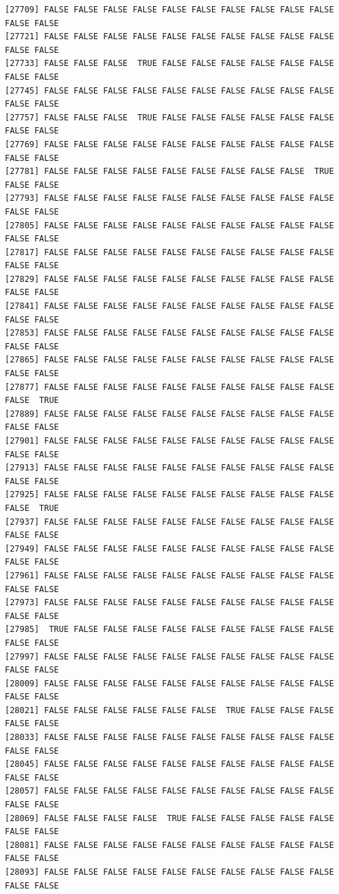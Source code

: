 \documentclass[
  a4paper,
  DIV=11,
  numbers=noendperiod]{scrartcl}
\begin{document}
\begin{verbatim}
[27709] FALSE FALSE FALSE FALSE FALSE FALSE FALSE FALSE FALSE FALSE FALSE FALSE
[27721] FALSE FALSE FALSE FALSE FALSE FALSE FALSE FALSE FALSE FALSE FALSE FALSE
[27733] FALSE FALSE FALSE  TRUE FALSE FALSE FALSE FALSE FALSE FALSE FALSE FALSE
[27745] FALSE FALSE FALSE FALSE FALSE FALSE FALSE FALSE FALSE FALSE FALSE FALSE
[27757] FALSE FALSE FALSE  TRUE FALSE FALSE FALSE FALSE FALSE FALSE FALSE FALSE
[27769] FALSE FALSE FALSE FALSE FALSE FALSE FALSE FALSE FALSE FALSE FALSE FALSE
[27781] FALSE FALSE FALSE FALSE FALSE FALSE FALSE FALSE FALSE  TRUE FALSE FALSE
[27793] FALSE FALSE FALSE FALSE FALSE FALSE FALSE FALSE FALSE FALSE FALSE FALSE
[27805] FALSE FALSE FALSE FALSE FALSE FALSE FALSE FALSE FALSE FALSE FALSE FALSE
[27817] FALSE FALSE FALSE FALSE FALSE FALSE FALSE FALSE FALSE FALSE FALSE FALSE
[27829] FALSE FALSE FALSE FALSE FALSE FALSE FALSE FALSE FALSE FALSE FALSE FALSE
[27841] FALSE FALSE FALSE FALSE FALSE FALSE FALSE FALSE FALSE FALSE FALSE FALSE
[27853] FALSE FALSE FALSE FALSE FALSE FALSE FALSE FALSE FALSE FALSE FALSE FALSE
[27865] FALSE FALSE FALSE FALSE FALSE FALSE FALSE FALSE FALSE FALSE FALSE FALSE
[27877] FALSE FALSE FALSE FALSE FALSE FALSE FALSE FALSE FALSE FALSE FALSE  TRUE
[27889] FALSE FALSE FALSE FALSE FALSE FALSE FALSE FALSE FALSE FALSE FALSE FALSE
[27901] FALSE FALSE FALSE FALSE FALSE FALSE FALSE FALSE FALSE FALSE FALSE FALSE
[27913] FALSE FALSE FALSE FALSE FALSE FALSE FALSE FALSE FALSE FALSE FALSE FALSE
[27925] FALSE FALSE FALSE FALSE FALSE FALSE FALSE FALSE FALSE FALSE FALSE  TRUE
[27937] FALSE FALSE FALSE FALSE FALSE FALSE FALSE FALSE FALSE FALSE FALSE FALSE
[27949] FALSE FALSE FALSE FALSE FALSE FALSE FALSE FALSE FALSE FALSE FALSE FALSE
[27961] FALSE FALSE FALSE FALSE FALSE FALSE FALSE FALSE FALSE FALSE FALSE FALSE
[27973] FALSE FALSE FALSE FALSE FALSE FALSE FALSE FALSE FALSE FALSE FALSE FALSE
[27985]  TRUE FALSE FALSE FALSE FALSE FALSE FALSE FALSE FALSE FALSE FALSE FALSE
[27997] FALSE FALSE FALSE FALSE FALSE FALSE FALSE FALSE FALSE FALSE FALSE FALSE
[28009] FALSE FALSE FALSE FALSE FALSE FALSE FALSE FALSE FALSE FALSE FALSE FALSE
[28021] FALSE FALSE FALSE FALSE FALSE FALSE  TRUE FALSE FALSE FALSE FALSE FALSE
[28033] FALSE FALSE FALSE FALSE FALSE FALSE FALSE FALSE FALSE FALSE FALSE FALSE
[28045] FALSE FALSE FALSE FALSE FALSE FALSE FALSE FALSE FALSE FALSE FALSE FALSE
[28057] FALSE FALSE FALSE FALSE FALSE FALSE FALSE FALSE FALSE FALSE FALSE FALSE
[28069] FALSE FALSE FALSE FALSE  TRUE FALSE FALSE FALSE FALSE FALSE FALSE FALSE
[28081] FALSE FALSE FALSE FALSE FALSE FALSE FALSE FALSE FALSE FALSE FALSE FALSE
[28093] FALSE FALSE FALSE FALSE FALSE FALSE FALSE FALSE FALSE FALSE FALSE FALSE

\end{verbatim}
\end{document}
